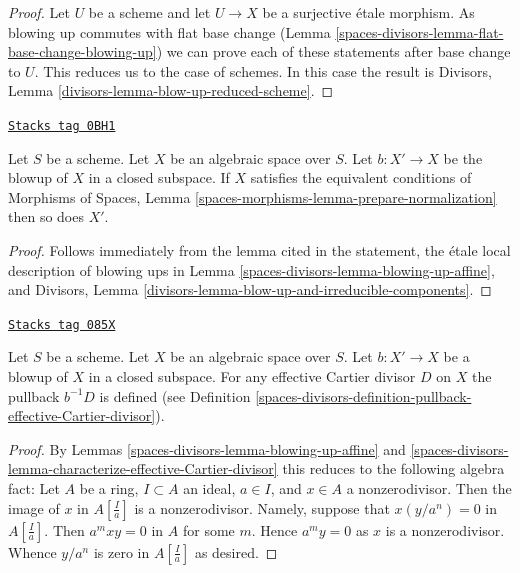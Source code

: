 \begin{proof}
Let $U$ be a scheme and let $U \to X$ be a surjective \'etale morphism.
As blowing up commutes with flat base change
(Lemma \ref{spaces-divisors-lemma-flat-base-change-blowing-up})
we can prove each of these statements after base change to $U$.
This reduces us to the case of schemes.
In this case the result is
Divisors, Lemma \ref{divisors-lemma-blow-up-reduced-scheme}.
\end{proof}

\begin{lemma}
\label{spaces-divisors-lemma-blowup-finite-nr-irreducibles}
\href{https://stacks.math.columbia.edu/tag/0BH1}{\texttt{Stacks tag 0BH1}}

Let $S$ be a scheme. Let $X$ be an algebraic space over $S$. Let
$b : X' \to X$ be the blowup of $X$ in a closed subspace. If
$X$ satisfies the equivalent conditions of
Morphisms of Spaces, Lemma \ref{spaces-morphisms-lemma-prepare-normalization}
then so does $X'$.
\end{lemma}

\begin{proof}
Follows immediately from the lemma cited in the statement,
the \'etale local description of blowing ups in
Lemma \ref{spaces-divisors-lemma-blowing-up-affine}, and
Divisors, Lemma \ref{divisors-lemma-blow-up-and-irreducible-components}.
\end{proof}

\begin{lemma}
\label{spaces-divisors-lemma-blow-up-pullback-effective-Cartier}
\href{https://stacks.math.columbia.edu/tag/085X}{\texttt{Stacks tag 085X}}

Let $S$ be a scheme. Let $X$ be an algebraic space over $S$.
Let $b : X' \to X$ be a blowup of $X$ in a closed subspace.
For any effective Cartier divisor $D$ on $X$ the pullback
$b^{-1}D$ is defined (see Definition
\ref{spaces-divisors-definition-pullback-effective-Cartier-divisor}).
\end{lemma}

\begin{proof}
By Lemmas \ref{spaces-divisors-lemma-blowing-up-affine} and
\ref{spaces-divisors-lemma-characterize-effective-Cartier-divisor}
this reduces to the following algebra fact:
Let $A$ be a ring, $I \subset A$ an ideal, $a \in I$, and $x \in A$
a nonzerodivisor. Then the image of $x$ in $A[\frac{I}{a}]$ is a
nonzerodivisor. Namely, suppose that $x (y/a^n) = 0$ in $A[\frac{I}{a}]$.
Then $a^mxy = 0$ in $A$ for some $m$. Hence $a^my = 0$ as $x$ is a
nonzerodivisor. Whence $y/a^n$ is zero in $A[\frac{I}{a}]$ as desired.
\end{proof}

